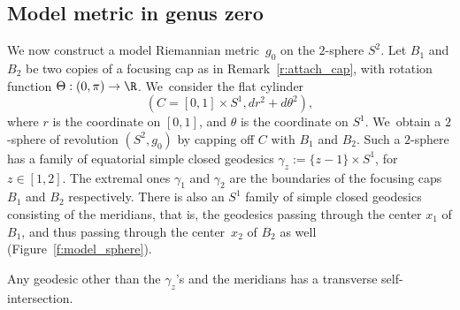 \subsection{Model metric in genus zero}
We now construct a model Riemannian metric~$g_0$ on the $2$-sphere $S^2$.
Let $B_1$ and $B_2$ be two copies of a focusing cap as in Remark~\ref{r:attach_cap}, with rotation function $\Theta:(0,\pi)\to\R$. We~consider the flat cylinder \[
(C=[0,1]\times S^1,dr^2+d\theta^2),
\]
where $r$ is the coordinate on $[0,1]$, and $\theta$ is the coordinate on $S^1$. We~obtain a $2$-sphere of revolution $(S^2,g_0)$ by capping off $C$ with $B_1$ and $B_2$.
Such a $2$-sphere has a family of equatorial simple closed geodesics $\gamma_z:=\{z-1\}\times S^1$, for $z\in[1,2]$. The extremal ones $\gamma_1$ and $\gamma_{2}$ are the boundaries of the focusing caps $B_1$ and $B_2$ respectively. There is also an $S^1$ family of simple closed geodesics consisting of the meridians, that is, the geodesics passing through the center $x_1$ of $B_1$, and thus passing through the center~$x_2$ of $B_2$ as well (Figure~\ref{f:model_sphere}).

\begin{Lemma}\label{l:only_meridians}
Any geodesic other than the $\gamma_z$'s and the meridians has a transverse self-intersection.
\end{Lemma}

